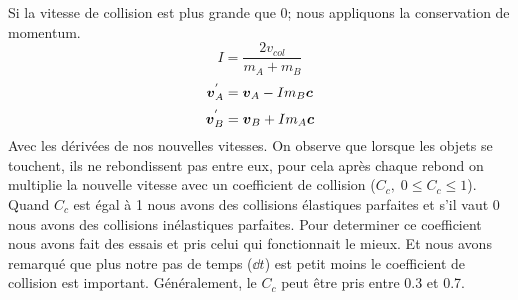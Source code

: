             Si la vitesse de collision est plus grande que 0; nous appliquons la conservation de momentum.
            \begin{equation}
                I = \frac{2v_{col}}{m_A + m_B}
            \end{equation}
            \begin{equation}
                \vb*{v}_A^{'} = \vb*{v}_A - Im_B\vb*{c}
            \end{equation}
            \begin{equation}
                \vb*{v}_B^{'} = \vb*{v}_B + Im_A\vb*{c}
            \end{equation}
            Avec les dérivées de nos nouvelles vitesses. On observe que lorsque les objets se touchent, ils ne rebondissent pas entre eux, pour cela après chaque rebond on multiplie la nouvelle vitesse avec un coefficient de collision ($C_{c} ,\;0 \leq C_{c} \leq  1$). Quand $C_{c}$ est égal à 1 nous avons des collisions élastiques parfaites et s'il vaut 0 nous avons des collisions inélastiques parfaites. Pour determiner ce coefficient nous avons fait des essais et pris celui qui fonctionnait le mieux. Et nous avons remarqué que plus notre pas de temps ($\dd t$) est petit moins le coefficient de collision est important. Généralement, le $C_c$ peut être pris entre 0.3 et  0.7.
            

